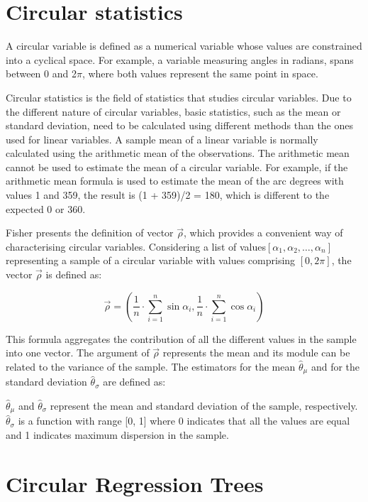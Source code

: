 \documentclass[times,twocolumn,final,authoryear]{elsarticle}
\begin{document}
\section{Circular statistics}
A circular variable is defined as a numerical variable whose values are constrained into a cyclical space. For example, a variable measuring angles in radians, spans between 0 and 2$ \pi $, where both values represent the same point in space.

Circular statistics is the field of statistics that studies circular variables. Due to the different nature of circular variables, basic statistics, such as the mean or standard deviation, need to be calculated using different methods than the ones used for linear variables. A sample mean of a linear variable is normally calculated using the arithmetic mean of the observations. The arithmetic mean cannot be used to estimate the mean of a circular variable. For example, if the arithmetic mean formula is used to estimate the mean of the arc degrees with values 1 and 359, the result is (1 + 359)/2 = 180, which is different to the expected 0 or 360.

Fisher \citep{Fisher1992} presents the definition of vector $ \vec{\rho} $, which provides a convenient way of characterising circular variables. Considering a list of values$ [\alpha_1, \alpha_2, \dots, \alpha_n] $ representing a sample of a circular variable with values comprising $ [0, 2\pi] $, the vector $ \vec{\rho} $ is defined as:

\begin{displaymath}
\vec{\rho} = \left(\frac{1}{n}\cdot\sum_{i=1}^n \sin\alpha_i, \frac{1}{n}\cdot\sum_{i=1}^n \cos\alpha_i\right)
\end{displaymath}

This formula aggregates the contribution of all the different values in the sample into one vector. The argument of $ \vec{\rho} $ represents the mean and its module can be related to the variance of the sample. The estimators for the mean $ \hat{\theta}_{\mu} $ and for the standard deviation $ \hat{\theta}_{\sigma} $ are defined as: 

$ \hat{\theta}_{\mu} $ and $ \hat{\theta}_{\sigma} $ represent the mean and standard deviation of the sample, respectively. $ \hat{\theta}_{\sigma} $ is a function with range [0, 1] where 0 indicates that all the values are equal and 1 indicates maximum dispersion in the sample.


\section{Circular Regression Trees}
\end{document}
